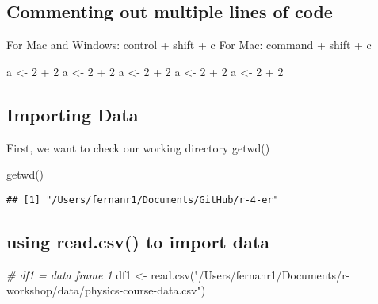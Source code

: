 \documentclass[
]{book}
\newenvironment{Shaded}{\begin{snugshade}}{\end{snugshade}}
\newcommand{\CommentTok}[1]{\textcolor[rgb]{0.56,0.35,0.01}{\textit{#1}}}
\newcommand{\DecValTok}[1]{\textcolor[rgb]{0.00,0.00,0.81}{#1}}
\newcommand{\FunctionTok}[1]{\textcolor[rgb]{0.00,0.00,0.00}{#1}}
\newcommand{\NormalTok}[1]{#1}
\newcommand{\OtherTok}[1]{\textcolor[rgb]{0.56,0.35,0.01}{#1}}
\newcommand{\SpecialCharTok}[1]{\textcolor[rgb]{0.00,0.00,0.00}{#1}}
\newcommand{\StringTok}[1]{\textcolor[rgb]{0.31,0.60,0.02}{#1}}
\begin{document}
\hypertarget{commenting-out-multiple-lines-of-code}{%
\subsection{Commenting out multiple lines of code}\label{commenting-out-multiple-lines-of-code}}

For Mac and Windows: control + shift + c For Mac: command + shift + c

\begin{Shaded}
\begin{Highlighting}[]
\NormalTok{a }\OtherTok{\textless{}{-}} \DecValTok{2} \SpecialCharTok{+} \DecValTok{2}
\NormalTok{a }\OtherTok{\textless{}{-}} \DecValTok{2} \SpecialCharTok{+} \DecValTok{2}
\NormalTok{a }\OtherTok{\textless{}{-}} \DecValTok{2} \SpecialCharTok{+} \DecValTok{2}
\NormalTok{a }\OtherTok{\textless{}{-}} \DecValTok{2} \SpecialCharTok{+} \DecValTok{2}
\NormalTok{a }\OtherTok{\textless{}{-}} \DecValTok{2} \SpecialCharTok{+} \DecValTok{2}
\end{Highlighting}
\end{Shaded}

\hypertarget{importing-data}{%
\subsection{Importing Data}\label{importing-data}}

First, we want to check our working directory getwd()

\begin{Shaded}
\begin{Highlighting}[]
\FunctionTok{getwd}\NormalTok{()}
\end{Highlighting}
\end{Shaded}

\begin{verbatim}
## [1] "/Users/fernanr1/Documents/GitHub/r-4-er"
\end{verbatim}

\hypertarget{using-read.csv-to-import-data}{%
\subsection{using read.csv() to import data}\label{using-read.csv-to-import-data}}

\begin{Shaded}
\begin{Highlighting}[]
\CommentTok{\# df1 = data frame 1}
\NormalTok{df1 }\OtherTok{\textless{}{-}} \FunctionTok{read.csv}\NormalTok{(}\StringTok{"/Users/fernanr1/Documents/r{-}workshop/data/physics{-}course{-}data.csv"}\NormalTok{)}
\end{Highlighting}
\end{Shaded}
\end{document}
